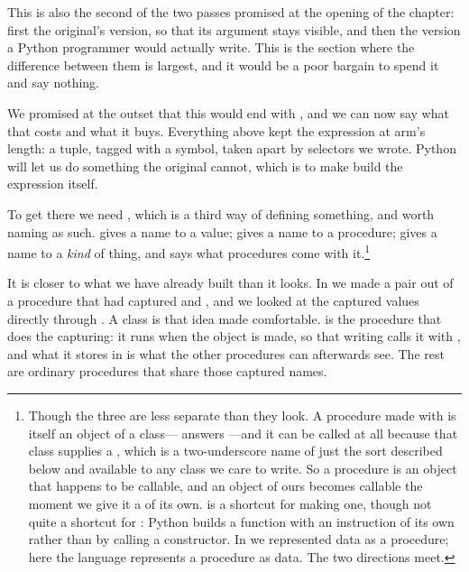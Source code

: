 This is also the second of the two passes promised at the opening of the
chapter: first the original's version, so that its argument stays visible, and
then the version a Python programmer would actually write.  This is the section
where the difference between them is largest, and it would be a poor bargain to
spend it and say nothing.

\begin{revealTheSurface}
We promised at the outset that this would end with , and
we can now say what that costs and what it buys.  Everything above kept the
expression at arm's length: a tuple, tagged with a symbol, taken apart by
selectors we wrote.  Python will let us do something the original cannot, which
is to make  build the expression itself.

To get there we need , which is a third way of defining something,
and worth naming as such.  \code{=} gives a name to a value;  gives a
name to a procedure;  gives a name to a \emph{kind} of thing, and
says what procedures come with it.\footnote{Though the three are less separate
than they look.  A procedure made with  is itself an object of a
class--- answers ---and it can be
called at all because that class supplies a , which is a
two-underscore name of just the sort described below and available to any class
we care to write.  So a procedure is an object that happens to be callable, and
an object of ours becomes callable the moment we give it a 
of its own.   is a shortcut for making one, though not quite a
shortcut for : Python builds a function with an instruction
of its own rather than by calling a constructor.  In  we
represented data as a procedure; here the language represents a procedure as
data.  The two directions meet.}

It is closer to what we have already built than it looks.  In
 we made a pair out of a procedure that had captured
 and , and we looked at the captured values directly through
.  A class is that idea made comfortable.
 is the procedure that does the capturing: it runs when the
object is made, so that writing  calls it with ,
and what it stores in  is what the other procedures can afterwards
see.  The rest are ordinary procedures that share those captured names.


\end{revealTheSurface}
